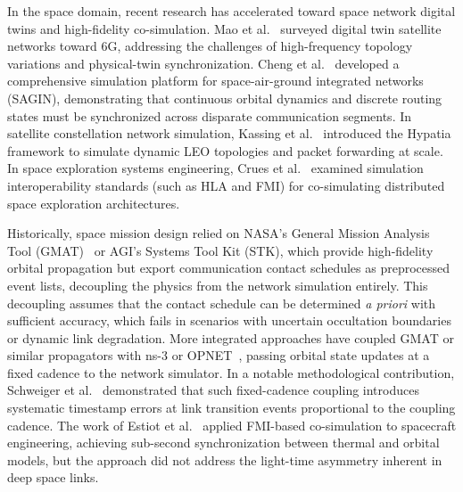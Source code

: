 \documentclass[a4paper,fleqn]{cas-sc}
\begin{document}
{\color{revcolor}In the space domain, recent research has accelerated toward space network digital twins and high-fidelity co-simulation. Mao et al.~\cite{mao_satellite_dt_2024} surveyed digital twin satellite networks toward 6G, addressing the challenges of high-frequency topology variations and physical-twin synchronization. Cheng et al.~\cite{cheng_sagin_sim_2020} developed a comprehensive simulation platform for space-air-ground integrated networks (SAGIN), demonstrating that continuous orbital dynamics and discrete routing states must be synchronized across disparate communication segments. In satellite constellation network simulation, Kassing et al.~\cite{kassing_hypatia_2020} introduced the Hypatia framework to simulate dynamic LEO topologies and packet forwarding at scale. In space exploration systems engineering, Crues et al.~\cite{crues_space_cosim_2022} examined simulation interoperability standards (such as HLA and FMI) for co-simulating distributed space exploration architectures.}

Historically, space mission design relied on NASA's General Mission Analysis Tool (GMAT)~\cite{gmat} or AGI's Systems Tool Kit (STK), which provide high-fidelity orbital propagation but export communication contact schedules as preprocessed event lists, decoupling the physics from the network simulation entirely. This decoupling assumes that the contact schedule can be determined \emph{a priori} with sufficient accuracy, which fails in scenarios with uncertain occultation boundaries or dynamic link degradation. More integrated approaches have coupled GMAT or similar propagators with ns-3 or OPNET~\cite{opnet_gmat_coupling}, passing orbital state updates at a fixed cadence to the network simulator. In a notable methodological contribution, Schweiger et al.~\cite{simpat_multirate} demonstrated that such fixed-cadence coupling introduces systematic timestamp errors at link transition events proportional to the coupling cadence. The work of Estiot et al.~\cite{estiot} applied FMI-based co-simulation to spacecraft engineering, achieving sub-second synchronization between thermal and orbital models, but the approach did not address the light-time asymmetry inherent in deep space links.
\end{document}
